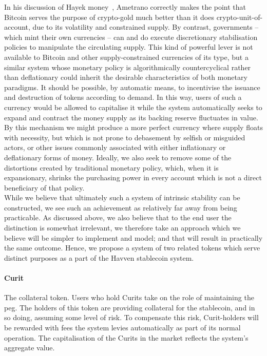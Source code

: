 \noindent  In his discussion of Hayek money~\cite{ametrano2016hayek}, Ametrano correctly makes the point that Bitcoin serves the purpose of crypto-gold much better than it does crypto-unit-of-account, due to its volatility and constrained supply. By contrast, governments -- which mint their own currencies -- can and do execute discretionary stabilisation policies to manipulate the circulating supply. This kind of powerful lever is not available to Bitcoin and other supply-constrained currencies of its type, but a similar system whose monetary policy is algorithmically countercyclical rather than deflationary could inherit the desirable characteristics of both monetary paradigms. It should be possible, by automatic means, to incentivise the issuance and destruction of tokens according to demand. In this way, users of such a currency would be allowed to capitalise it while the system automatically seeks to expand and contract the money supply as its backing reserve fluctuates in value. By this mechanism we might produce a more perfect currency where supply floats with necessity, but which is not prone to debasement by selfish or misguided actors, or other issues commonly associated with either inflationary or deflationary forms of money. Ideally, we also seek to remove some of the distortions created by traditional monetary policy, which, when it is expansionary, shrinks the purchasing power in every account which is not a direct beneficiary of that policy.\\

\noindent While we believe that ultimately such a system of intrinsic stability can be constructed, we see such an achievement as relatively far away from being practicable. As discussed above, we also believe that to the end user the distinction is somewhat irrelevant, we therefore take an approach which we believe will be simpler to implement and model; and that will result in practically the same outcome. Hence, we propose a system of two related tokens which serve distinct purposes as a part of the Havven stablecoin system.

\paragraph{Curit} The collateral token. Users who hold Curits take on the role of maintaining the peg. The holders of this token are providing collateral for the stablecoin, and in so doing, assuming some level of risk. To compensate this risk, Curit-holders will be rewarded with fees the system levies automatically as part of its normal operation. The capitalisation of the Curits in the market reflects the system's aggregate value.

